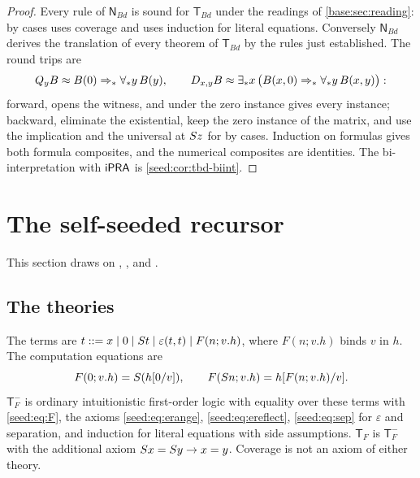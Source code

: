 \begin{proof}
Every rule of $\mathsf{N}_{Bd}$ is sound for $\mathsf{T}_{Bd}$ under the
readings of \cref{base:sec:reading}:  by cases uses coverage
and  uses induction for literal equations. Conversely
$\mathsf{N}_{Bd}$ derives the translation of every theorem of
$\mathsf{T}_{Bd}$ by the rules just established. The round trips are
\[
 Q_{y}B\approx B(0)\Rightarrow_*\forall_*y\,B(y),\qquad
 D_{x,y}B\approx
 \exists_*x\,\bigl(B(x,0)\Rightarrow_*\forall_*y\,B(x,y)\bigr):
\]
forward,  opens the witness, and under the zero instance
 gives every instance; backward, eliminate the existential, keep
the zero instance of the matrix, and use the implication and the universal
at $S z$ for  by cases. Induction on formulas gives both
formula composites, and the numerical composites are identities. The
bi-interpretation with $\mathsf{iPRA}$ is \cref{seed:cor:tbd-biint}.
\end{proof}

\section{The self-seeded recursor}
\label{seed:sec:self}

This section draws on , ,
 and .

\subsection{The theories}

\begin{definition}\label{seed:def:tf}
The terms are
$t\mathrel{::=}x\mid0\mid S t\mid\varepsilon(t,t)\mid F(n;v.h)$, where
$F(n;v.h)$ binds $v$ in $h$. The computation equations are
\begin{equation}\label{seed:eq:F}
 F(0;v.h)=S(h[0/v]),\qquad
 F(S n;v.h)=h[F(n;v.h)/v].
\end{equation}
$\mathsf{T}_F^{-}$ is ordinary intuitionistic first-order logic with
equality over these terms with \eqref{seed:eq:F}, the axioms
\eqref{seed:eq:erange}, \eqref{seed:eq:ereflect}, \eqref{seed:eq:sep} for
$\varepsilon$ and separation, and induction for literal equations with side
assumptions. $\mathsf{T}_F$ is $\mathsf{T}_F^{-}$ with the additional axiom
$S x=S y\to x=y$. Coverage is not an axiom of either theory.
\end{definition}

